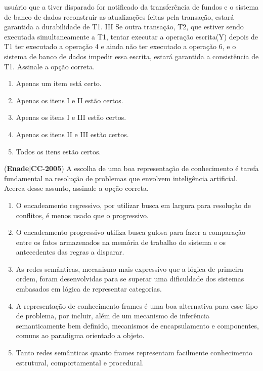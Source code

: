 \documentclass{exam}
\begin{document}
\begin{questions}
usuário que a tiver disparado for notificado da transferência
de fundos e o sistema de banco de dados reconstruir as
atualizações feitas pela transação, estará garantida a
durabilidade de T1.
III Se outra transação, T2, que estiver sendo executada
simultaneamente a T1, tentar executar a operação
escrita(Y) depois de T1 ter executado a operação 4 e
ainda não ter executado a operação 6, e o sistema de banco
de dados impedir essa escrita, estará garantida a consistência
de T1.
Assinale a opção correta.
	\begin{enumerate}[label=\alph*)]
		\item  Apenas um item está certo.
		\item  Apenas os itens I e II estão certos.
		\item  Apenas os itens I e III estão certos.
		\item  Apenas os itens II e III estão certos.
		\item  Todos os itens estão certos.

	\end{enumerate}

\question (\textbf{Enade}$|$\textbf{CC}-\textbf{2005}) A escolha de uma boa representação de conhecimento é tarefa
fundamental na resolução de problemas que envolvem
inteligência artificial. Acerca desse assunto, assinale a opção
correta.
	\begin{enumerate}[label=\alph*)]
		\item  O encadeamento regressivo, por utilizar busca em largura
para resolução de conflitos, é menos usado que o progressivo.
		\item  O encadeamento progressivo utiliza busca gulosa para fazer
a comparação entre os fatos armazenados na memória de
trabalho do sistema e os antecedentes das regras a disparar.
		\item  As redes semânticas, mecanismo mais expressivo que a
lógica de primeira ordem, foram desenvolvidas para se
superar uma dificuldade dos sistemas embasados em lógica
de representar categorias.
		\item  A representação de conhecimento frames é uma boa
alternativa para esse tipo de problema, por incluir, além de
um mecanismo de inferência semanticamente bem definido,
mecanismos de encapsulamento e componentes, comuns ao
paradigma orientado a objeto.
		\item  Tanto redes semânticas quanto frames representam
facilmente conhecimento estrutural, comportamental e
procedural.

	\end{enumerate}


\end{questions}
\end{document}
